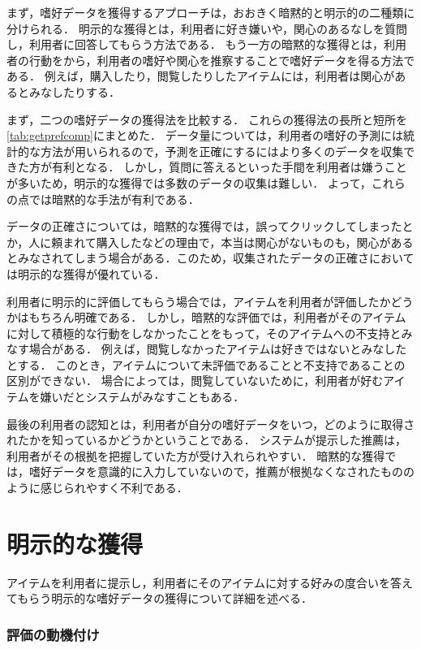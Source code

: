 まず，嗜好データを獲得するアプローチは，おおきく暗黙的と明示的の二種類に分けられる．
明示的な獲得とは，利用者に好き嫌いや，関心のあるなしを質問し，利用者に回答してもらう方法である．
もう一方の暗黙的な獲得とは，利用者の行動をから，利用者の嗜好や関心を推察することで嗜好データを得る方法である．
例えば，購入したり，閲覧したりしたアイテムには，利用者は関心があるとみなしたりする．

まず，二つの嗜好データの獲得法を比較する．
これらの獲得法の長所と短所を\ref{tab:getprefcomp}にまとめた．
データ量については，利用者の嗜好の予測には統計的な方法が用いられるので，予測を正確にするにはより多くのデータを収集できた方が有利となる．
しかし，質問に答えるといった手間を利用者は嫌うことが多いため，明示的な獲得では多数のデータの収集は難しい．
よって，これらの点では暗黙的な手法が有利である．

データの正確さについては，暗黙的な獲得では，誤ってクリックしてしまったとか，人に頼まれて購入したなどの理由で，本当は関心がないものも，関心があるとみなされてしまう場合がある．このため，収集されたデータの正確さにおいては明示的な獲得が優れている．

利用者に明示的に評価してもらう場合では，アイテムを利用者が評価したかどうかはもちろん明確である．
しかし，暗黙的な評価では，利用者がそのアイテムに対して積極的な行動をしなかったことをもって，そのアイテムへの不支持とみなす場合がある．
例えば，閲覧しなかったアイテムは好きではないとみなしたとする．
このとき，アイテムについて未評価であることと不支持であることの区別ができない．
場合によっては，閲覧していないために，利用者が好むアイテムを嫌いだとシステムがみなすこともある．

最後の利用者の認知とは，利用者が自分の嗜好データをいつ，どのように取得されたかを知っているかどうかということである．
システムが提示した推薦は，利用者がその根拠を把握していた方が受け入れられやすい．
暗黙的な獲得では，嗜好データを意識的に入力していないので，推薦が根拠なくなされたもののように感じられやすく不利である．

\section{明示的な獲得}
\label{sec:explicitrating}

アイテムを利用者に提示し，利用者にそのアイテムに対する好みの度合いを答えてもらう明示的な嗜好データの獲得について詳細を述べる．

\subsubsection{評価の動機付け}

